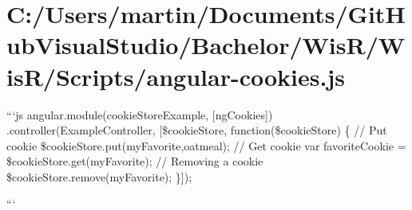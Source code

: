 \hypertarget{_c_1_2_users_2martin_2_documents_2_git_hub_visual_studio_2_bachelor_2_wis_r_2_wis_r_2_scripts_2angular-cookies_8js-example}{}\section{C\+:/\+Users/martin/\+Documents/\+Git\+Hub\+Visual\+Studio/\+Bachelor/\+Wis\+R/\+Wis\+R/\+Scripts/angular-\/cookies.\+js}

\begin{DoxyItemize}
\item ```js angular.\+module(\textquotesingle{}cookie\+Store\+Example\textquotesingle{}, \mbox{[}\textquotesingle{}ng\+Cookies\textquotesingle{}\mbox{]}) .controller(\textquotesingle{}Example\+Controller\textquotesingle{}, \mbox{[}\textquotesingle{}\$cookie\+Store\textquotesingle{}, function(\$cookie\+Store) \{ // Put cookie \$cookie\+Store.\+put(\textquotesingle{}my\+Favorite\textquotesingle{},\textquotesingle{}oatmeal\textquotesingle{}); // Get cookie var favorite\+Cookie = \$cookie\+Store.\+get(\textquotesingle{}my\+Favorite\textquotesingle{}); // Removing a cookie \$cookie\+Store.\+remove(\textquotesingle{}my\+Favorite\textquotesingle{}); \}\mbox{]});
\item ```
\end{DoxyItemize}


